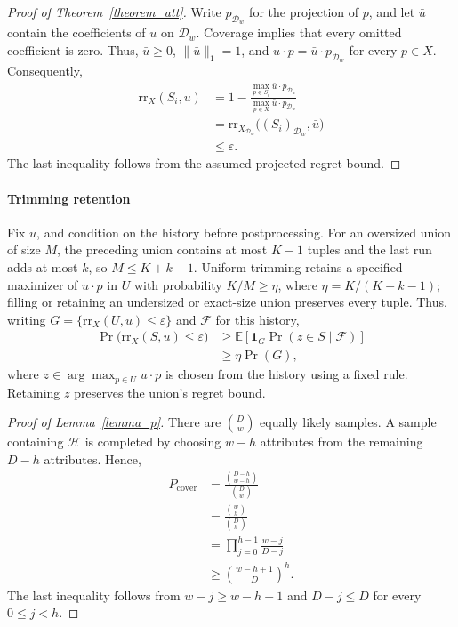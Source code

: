 \documentclass[conference]{IEEEtran}
\theoremstyle{definition}
\theoremstyle{plain}
\begin{document}
\begin{proof}[Proof of Theorem~\ref{theorem_att}]
Write $p_{\mathcal{D}_w}$ for the projection of $p$, and let $\bar u$ contain the coefficients of $u$ on $\mathcal{D}_w$. Coverage implies that every omitted coefficient is zero. Thus, $\bar u\geq0$, $\lVert\bar u\rVert_1=1$, and $u\cdot p=\bar u\cdot p_{\mathcal{D}_w}$ for every $p\in X$. Consequently,
\[
\begin{aligned}
\mathrm{rr}_X(S_i,u)
&=1-\frac{\max_{p\in S_i}\bar u\cdot p_{\mathcal{D}_w}}
{\max_{p\in X}\bar u\cdot p_{\mathcal{D}_w}}\\
&=\mathrm{rr}_{X_{\mathcal{D}_w}}\bigl((S_i)_{\mathcal{D}_w},\bar u\bigr)\\
&\leq\varepsilon.
\end{aligned}
\]
The last inequality follows from the assumed projected regret bound.
\end{proof}

\paragraph{Trimming retention}
Fix $u$, and condition on the history before postprocessing. For an oversized union of size $M$, the preceding union contains at most $K-1$ tuples and the last run adds at most $k$, so $M\leq K+k-1$. Uniform trimming retains a specified maximizer of $u\cdot p$ in $U$ with probability $K/M\geq\eta$, where $\eta=K/(K+k-1)$; filling or retaining an undersized or exact-size union preserves every tuple. Thus, writing $G=\{\mathrm{rr}_X(U,u)\leq\varepsilon\}$ and $\mathcal{F}$ for this history,
\[
\begin{aligned}
\Pr\bigl(\mathrm{rr}_X(S,u)\leq\varepsilon\bigr)
&\geq\mathbb{E}\!\left[\mathbf{1}_G\Pr(z\in S\mid\mathcal{F})\right]\\
&\geq\eta\Pr(G),
\end{aligned}
\]
where $z\in\arg\max_{p\in U}u\cdot p$ is chosen from the history using a fixed rule. Retaining $z$ preserves the union's regret bound.

\begin{proof}[Proof of Lemma~\ref{lemma_p}]
There are $\binom Dw$ equally likely samples. A sample containing $\mathcal{H}$ is completed by choosing $w-h$ attributes from the remaining $D-h$ attributes. Hence,
\[
\begin{aligned}
P_\text{cover}&=\frac{\binom{D-h}{w-h}}{\binom Dw}\\
&=\frac{\binom wh}{\binom Dh}\\
&=\prod_{j=0}^{h-1}\frac{w-j}{D-j}\\
&\geq\left(\frac{w-h+1}{D}\right)^h.
\end{aligned}
\]
The last inequality follows from $w-j\geq w-h+1$ and $D-j\leq D$ for every $0\leq j<h$.
\end{proof}
\end{document}
